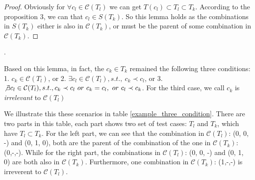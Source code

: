 \documentclass{sig-alternate}
\begin{document}
\begin{proof}
Obviously for $\forall c_{l} \in \mathcal{C}(T_{l}) $ we can get $T(c_{l}) \subset T_{l} \subset T_{k}$. According to the proposition 3, we can that $c_{l} \in S(T_{k})$. So this lemma holds as the combinations in $S(T_{k})$ either is also in $\mathcal{C}(T_{k})$, or must be the parent of some combination in $\mathcal{C}(T_{k})$.
\end{proof}.


Based on this lemma, in fact, the $c_{k} \in T_{k}$  remained the following three conditions: 1. $c_{k} \in \mathcal{C}(T_{l})$, or 2. $\exists c_{l} \in \mathcal{C}(T_{l}), s.t.,\ c_{k} \prec c_{l}$, or 3. $\not\exists c_{l} \in \mathcal{C}(T_{l}), s.t., c_{k} \prec c_{l}\ or\ c_{k} = c_{l},\ or\ c_{l} \prec c_{k}$. For the third case, we call $c_{k}$ is \emph{irrelevant} to $\mathcal{C}(T_{l})$

We illustrate this these scenarios in table \ref{example_three_condition}. There are two parts in this table, each part shows two set of test cases: $T_{l}$ and $T_{k}$, which have $T_{l} \subset T_{k}$. For the left part, we can see that the combination in $\mathcal{C}(T_{l})$: (0, 0, -) and (0, 1, 0), both are the parent of the combination of the one in $\mathcal{C}(T_{k})$:(0,-,-). While for the right part, the combinations in $\mathcal{C}(T_{l})$: (0, 0, -) and (0, 1, 0) are both also in $\mathcal{C}(T_{k})$. Furthermore, one combination in $\mathcal{C}(T_{k})$: (1,-,-) is irreverent to $\mathcal{C}(T_{l})$.


%
\end{document}
